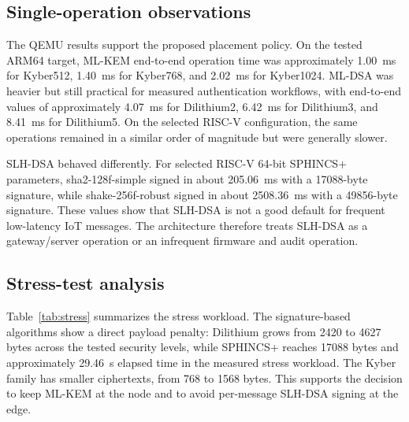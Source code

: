 \documentclass[conference,10pt,letterpaper]{IEEEtran}
\begin{document}
\subsection{Single-operation observations}

The QEMU results support the proposed placement policy. On the tested ARM64 target, ML-KEM end-to-end operation time was approximately 1.00~ms for Kyber512, 1.40~ms for Kyber768, and 2.02~ms for Kyber1024. ML-DSA was heavier but still practical for measured authentication workflows, with end-to-end values of approximately 4.07~ms for Dilithium2, 6.42~ms for Dilithium3, and 8.41~ms for Dilithium5. On the selected RISC-V configuration, the same operations remained in a similar order of magnitude but were generally slower.

SLH-DSA behaved differently. For selected RISC-V 64-bit SPHINCS+ parameters, sha2-128f-simple signed in about 205.06~ms with a 17088-byte signature, while shake-256f-robust signed in about 2508.36~ms with a 49856-byte signature. These values show that SLH-DSA is not a good default for frequent low-latency IoT messages. The architecture therefore treats SLH-DSA as a gateway/server operation or an infrequent firmware and audit operation.

\subsection{Stress-test analysis}

Table~\ref{tab:stress} summarizes the stress workload. The signature-based algorithms show a direct payload penalty: Dilithium grows from 2420 to 4627 bytes across the tested security levels, while SPHINCS+ reaches 17088 bytes and approximately 29.46~s elapsed time in the measured stress workload. The Kyber family has smaller ciphertexts, from 768 to 1568 bytes. This supports the decision to keep ML-KEM at the node and to avoid per-message SLH-DSA signing at the edge.
\end{document}
